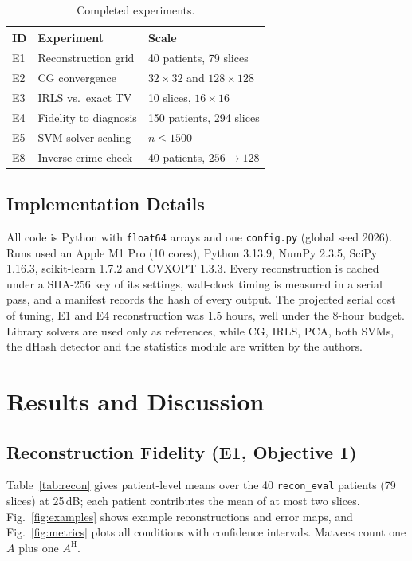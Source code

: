 \documentclass[conference,a4paper]{IEEEtran}
\newcommand{\AH}{A^{\mathrm{H}}}
\begin{document}
\begin{table}[!t]
\centering
\caption{Completed experiments.}
\label{tab:experiments}
\footnotesize
\begin{tabular}{@{}lll@{}}
\toprule
ID & Experiment & Scale\\
\midrule
E1 & Reconstruction grid & 40 patients, 79 slices\\
E2 & CG convergence & $32\times32$ and $128\times128$\\
E3 & IRLS vs.\ exact TV & 10 slices, $16\times16$\\
E4 & Fidelity to diagnosis & 150 patients, 294 slices\\
E5 & SVM solver scaling & $n\le1500$\\
E8 & Inverse-crime check & 40 patients, $256\to128$\\
\bottomrule
\end{tabular}
\end{table}

\subsection{Implementation Details}
All code is Python with \texttt{float64} arrays and one \texttt{config.py} (global seed 2026). Runs used an Apple M1 Pro (10 cores), Python 3.13.9, NumPy 2.3.5, SciPy 1.16.3, scikit-learn 1.7.2 and CVXOPT 1.3.3. Every reconstruction is cached under a SHA-256 key of its settings, wall-clock timing is measured in a serial pass, and a manifest records the hash of every output. The projected serial cost of tuning, E1 and E4 reconstruction was 1.5 hours, well under the 8-hour budget. Library solvers are used only as references, while CG, IRLS, PCA, both SVMs, the dHash detector and the statistics module are written by the authors.

\section{Results and Discussion}

\subsection{Reconstruction Fidelity (E1, Objective 1)}
Table~\ref{tab:recon} gives patient-level means over the 40 \texttt{recon\_eval} patients (79 slices) at 25\,dB; each patient contributes the mean of at most two slices. Fig.~\ref{fig:examples} shows example reconstructions and error maps, and Fig.~\ref{fig:metrics} plots all conditions with confidence intervals. Matvecs count one $A$ plus one $\AH$.
\end{document}
